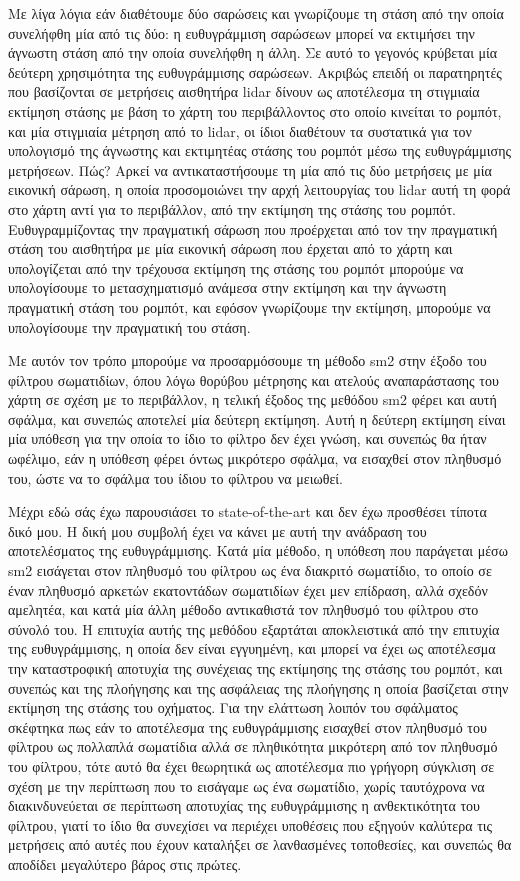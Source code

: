 \documentclass[a4paper,10pt]{article}
\begin{document}
Με λίγα λόγια εάν διαθέτουμε δύο σαρώσεις και γνωρίζουμε τη στάση από την οποία
συνελήφθη μία από τις δύο: η ευθυγράμμιση σαρώσεων μπορεί να εκτιμήσει την
άγνωστη στάση από την οποία συνελήφθη η άλλη. Σε αυτό το γεγονός κρύβεται μία
δεύτερη χρησιμότητα της ευθυγράμμισης σαρώσεων. Ακριβώς επειδή οι παρατηρητές
που βασίζονται σε μετρήσεις αισθητήρα lidar δίνουν ως αποτέλεσμα τη στιγμιαία
εκτίμηση στάσης με βάση το χάρτη του περιβάλλοντος στο οποίο κινείται το
ρομπότ, και μία στιγμιαία μέτρηση από το lidar, οι ίδιοι διαθέτουν τα συστατικά
για τον υπολογισμό της άγνωστης και εκτιμητέας στάσης του ρομπότ μέσω της
ευθυγράμμισης μετρήσεων. Πώς? Αρκεί να αντικαταστήσουμε τη μία από τις δύο
μετρήσεις με μία εικονική σάρωση, η οποία προσομοιώνει την αρχή λειτουργίας του
lidar αυτή τη φορά στο χάρτη αντί για το περιβάλλον, από την εκτίμηση της
στάσης του ρομπότ. Ευθυγραμμίζοντας την πραγματική σάρωση που προέρχεται
από τον την πραγματική στάση του αισθητήρα με μία εικονική σάρωση που έρχεται
από το χάρτη και υπολογίζεται από την τρέχουσα εκτίμηση της στάσης του ρομπότ
μπορούμε να υπολογίσουμε το μετασχηματισμό ανάμεσα στην εκτίμηση και την
άγνωστη πραγματική στάση του ρομπότ, και εφόσον γνωρίζουμε την εκτίμηση,
μπορούμε να υπολογίσουμε την πραγματική του στάση.

Με αυτόν τον τρόπο μπορούμε να προσαρμόσουμε τη μέθοδο sm2 στην έξοδο του
φίλτρου σωματιδίων, όπου λόγω θορύβου μέτρησης και ατελούς αναπαράστασης του
χάρτη σε σχέση με το περιβάλλον, η τελική έξοδος της μεθόδου sm2 φέρει και αυτή
σφάλμα, και συνεπώς αποτελεί μία δεύτερη εκτίμηση. Αυτή η δεύτερη εκτίμηση είναι
μία υπόθεση για την οποία το ίδιο το φίλτρο δεν έχει γνώση, και συνεπώς θα ήταν
ωφέλιμο, εάν η υπόθεση φέρει όντως μικρότερο σφάλμα, να εισαχθεί στον πληθυσμό
του, ώστε να το σφάλμα του ίδιου το φίλτρου να μειωθεί.

Μέχρι εδώ σάς έχω παρουσιάσει το state-of-the-art και δεν έχω προσθέσει τίποτα
δικό μου. Η δική μου συμβολή έχει να κάνει με αυτή την ανάδραση του
αποτελέσματος της ευθυγράμμισης. Κατά μία μέθοδο, η υπόθεση που παράγεται μέσω
sm2 εισάγεται στον πληθυσμό του φίλτρου ως ένα διακριτό σωματίδιο, το οποίο σε
έναν πληθυσμό αρκετών εκατοντάδων σωματιδίων έχει μεν επίδραση, αλλά σχεδόν
αμελητέα, και κατά μία άλλη μέθοδο αντικαθιστά τον πληθυσμό του φίλτρου στο
σύνολό του.  Η επιτυχία αυτής της μεθόδου εξαρτάται αποκλειστικά από την
επιτυχία της ευθυγράμμισης, η οποία δεν είναι εγγυημένη, και μπορεί να έχει ως
αποτέλεσμα την καταστροφική αποτυχία της συνέχειας της εκτίμησης της στάσης του
ρομπότ, και συνεπώς και της πλοήγησης και της ασφάλειας της πλοήγησης η οποία
βασίζεται στην εκτίμηση της στάσης του οχήματος. Για την ελάττωση λοιπόν του
σφάλματος σκέφτηκα πως εάν το αποτέλεσμα της ευθυγράμμισης εισαχθεί στον
πληθυσμό του φίλτρου ως πολλαπλά σωματίδια αλλά σε πληθικότητα μικρότερη από
τον πληθυσμό του φίλτρου, τότε αυτό θα έχει θεωρητικά ως αποτέλεσμα πιο γρήγορη
σύγκλιση σε σχέση με την περίπτωση που το εισάγαμε ως ένα σωματίδιο, χωρίς
ταυτόχρονα να διακινδυνεύεται σε περίπτωση αποτυχίας της ευθυγράμμισης η
ανθεκτικότητα του φίλτρου, γιατί το ίδιο θα συνεχίσει να περιέχει υποθέσεις που
εξηγούν καλύτερα τις μετρήσεις από αυτές που έχουν καταλήξει σε λανθασμένες
τοποθεσίες, και συνεπώς θα αποδίδει μεγαλύτερο βάρος στις πρώτες.
\end{document}
